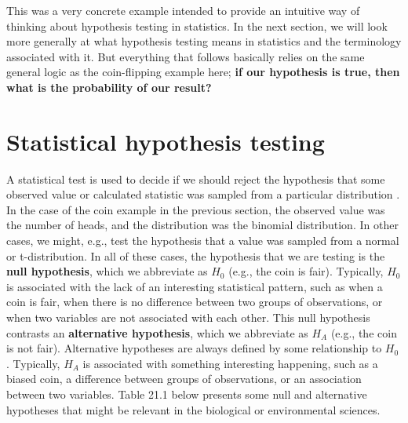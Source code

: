 \documentclass[
  openany]{scrbook}
\begin{document}
This was a very concrete example intended to provide an intuitive way of thinking about hypothesis testing in statistics.
In the next section, we will look more generally at what hypothesis testing means in statistics and the terminology associated with it.
But everything that follows basically relies on the same general logic as the coin-flipping example here; \textbf{if our hypothesis is true, then what is the probability of our result?}

\hypertarget{statistical-hypothesis-testing}{%
\section{Statistical hypothesis testing}\label{statistical-hypothesis-testing}}

A statistical test is used to decide if we should reject the hypothesis that some observed value or calculated statistic was sampled from a particular distribution \citep{Sokal1995}.
In the case of the coin example in the previous section, the observed value was the number of heads, and the distribution was the binomial distribution.
In other cases, we might, e.g., test the hypothesis that a value was sampled from a normal or t-distribution.
In all of these cases, the hypothesis that we are testing is the \textbf{null hypothesis}, which we abbreviate as \(H_{0}\) (e.g., the coin is fair).
Typically, \(H_{0}\) is associated with the lack of an interesting statistical pattern, such as when a coin is fair, when there is no difference between two groups of observations, or when two variables are not associated with each other.
This null hypothesis contrasts an \textbf{alternative hypothesis}, which we abbreviate as \(H_{A}\) (e.g., the coin is not fair).
Alternative hypotheses are always defined by some relationship to \(H_{0}\) \citep{Sokal1995}.
Typically, \(H_{A}\) is associated with something interesting happening, such as a biased coin, a difference between groups of observations, or an association between two variables.
Table 21.1 below presents some null and alternative hypotheses that might be relevant in the biological or environmental sciences.
\end{document}

